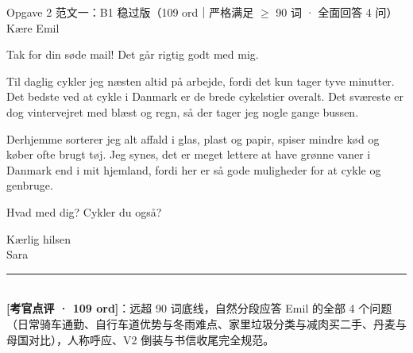\begin{emailbox}{Opgave 2 范文一：B1 稳过版（109 ord｜严格满足 $\ge$ 90 词 · 全面回答 4 问）}
Kære Emil

\vspace{0.25em}
Tak for din søde mail! Det går rigtig godt med mig.

\vspace{0.25em}
Til daglig cykler jeg næsten altid på arbejde, fordi det kun tager tyve minutter. Det bedste ved at cykle i Danmark er de brede cykelstier overalt. Det sværeste er dog vintervejret med blæst og regn, så der tager jeg nogle gange bussen.

\vspace{0.25em}
Derhjemme sorterer jeg alt affald i glas, plast og papir, spiser mindre kød og køber ofte brugt tøj. Jeg synes, det er meget lettere at have grønne vaner i Danmark end i mit hjemland, fordi her er så gode muligheder for at cykle og genbruge.

\vspace{0.25em}
Hvad med dig? Cykler du også?

\vspace{0.25em}
Kærlig hilsen\\
Sara

\vspace{0.3em}
\rule{\linewidth}{0.4pt}\\[0.2em]
\small\textbf{\color{NCDTeal}[考官点评 · 109 ord]}：远超 90 词底线，自然分段应答 Emil 的全部 4 个问题（日常骑车通勤、自行车道优势与冬雨难点、家里垃圾分类与减肉买二手、丹麦与母国对比），人称呼应、V2 倒装与书信收尾完全规范。
\end{emailbox}

